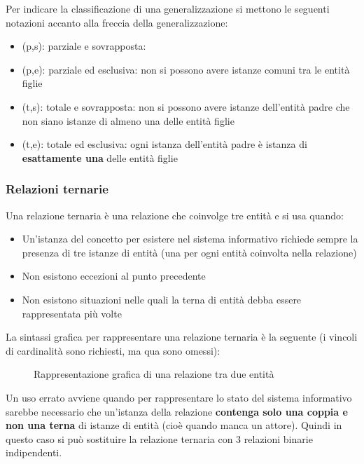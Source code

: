 \documentclass[a4paper]{article}
\begin{document}
\vspace{1em}
\noindent
Per indicare la classificazione di una generalizzazione si mettono le seguenti
notazioni accanto alla freccia della generalizzazione:
\begin{itemize}
  \item (p,s): parziale e sovrapposta: 
  \item (p,e): parziale ed esclusiva: non si possono avere istanze comuni tra le entità figlie
  \item (t,s): totale e sovrapposta: non si possono avere istanze dell'entità padre
    che non siano istanze di almeno una delle entità figlie
  \item (t,e): totale ed esclusiva: ogni istanza dell'entità padre è istanza
    di \textbf{esattamente una} delle entità figlie
\end{itemize}

\subsubsection{Relazioni ternarie}
Una relazione ternaria è una relazione che coinvolge tre entità e si usa quando:
\begin{itemize}
  \item Un'istanza del concetto per esistere nel sistema informativo richiede sempre
    la presenza di tre istanze di entità (una per ogni entità coinvolta nella relazione)

  \item Non esistono eccezioni al punto precedente
  \item Non esistono situazioni nelle quali la terna di entità debba essere rappresentata
    più volte
\end{itemize}
La sintassi grafica per rappresentare una relazione ternaria è la seguente (i vincoli
di cardinalità sono richiesti, ma qua sono omessi):

\begin{figure}[H]
  \centering
  \caption{Rappresentazione grafica di una relazione tra due entità}
\end{figure}
\noindent
Un uso errato avviene quando per rappresentare lo stato del sistema informativo
sarebbe necessario che un'istanza della relazione \textbf{contenga solo una
coppia e non una terna} di istanze di entità (cioè quando manca un attore).
Quindi in questo caso si può sostituire la relazione ternaria con 3 relazioni binarie
indipendenti.
\end{document}
